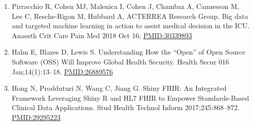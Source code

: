 \documentclass[
]{book}
\begin{document}
\begin{enumerate}
\item
  Pirracchio R, Cohen MJ, Malenica I, Cohen J, Chambaz A, Cannesson M, Lee C, Resche-Rigon M, Hubbard A, ACTERREA Research Group. Big data and targeted machine learning in action to assist medical decision in the ICU. Anaesth Crit Care Pain Med 2018 Oct 16; \url{PMID:30339893}
\item
  Hahn E, Blazes D, Lewis S. Understanding How the ``Open'' of Open Source Software (OSS) Will Improve Global Health Security. Health Secur 016 Jan;14(1):13--18. \url{PMID:26889576}
\item
  Hong N, Prodduturi N, Wang C, Jiang G. Shiny FHIR: An Integrated Framework Leveraging Shiny R and HL7 FHIR to Empower Standards-Based Clinical Data Applications. Stud Health Technol Inform 2017;245:868--872. \url{PMID:29295223}
\end{enumerate}

  
\end{document}
